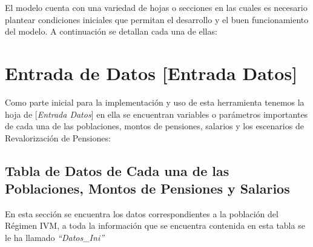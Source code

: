 \documentclass[
  letterpaper,
  DIV=11,
  numbers=noendperiod]{scrreprt}
\begin{document}
El modelo cuenta con una variedad de hojas o secciones en las cuales es
necesario plantear condiciones iniciales que permitan el desarrollo y el
buen funcionamiento del modelo. A continuación se detallan cada una de
ellas:

\hypertarget{entrada-de-datos-entrada-datos}{%
\section{Entrada de Datos {[}Entrada
Datos{]}}\label{entrada-de-datos-entrada-datos}}

Como parte inicial para la implementación y uso de esta herramienta
tenemos la hoja de {[}\emph{Entrada Datos}{]} en ella se encuentran
variables o parámetros importantes de cada una de las poblaciones,
montos de pensiones, salarios y los escenarios de Revalorización de
Pensiones:

\hypertarget{tabla-de-datos-de-cada-una-de-las-poblaciones-montos-de-pensiones-y-salarios}{%
\subsection{Tabla de Datos de Cada una de las Poblaciones, Montos de
Pensiones y
Salarios}\label{tabla-de-datos-de-cada-una-de-las-poblaciones-montos-de-pensiones-y-salarios}}

En esta sección se encuentra los datos correspondientes a la población
del Régimen IVM, a toda la información que se encuentra contenida en
esta tabla se le ha llamado \emph{``Datos\_Ini''}
\end{document}
